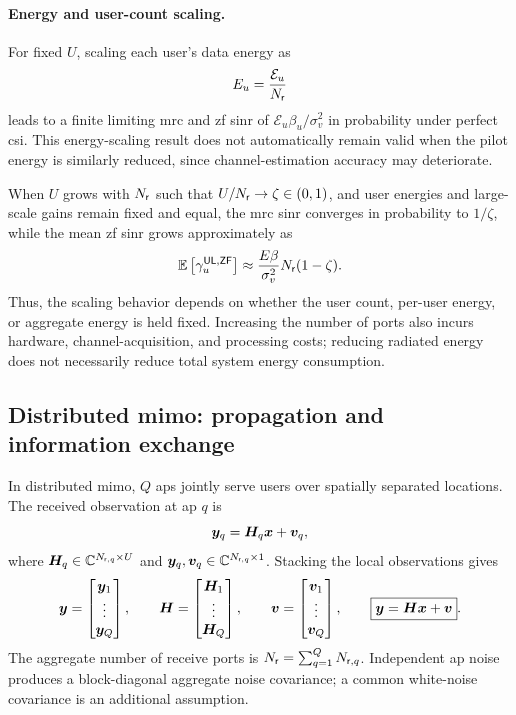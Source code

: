 \paragraph{Energy and user-count scaling.}
For fixed $U$, scaling each user's data energy as
\begin{equation*}
	E_u=\frac{\mathcal E_u}{N_{\mathsf{r}}}
\end{equation*}
leads to a finite limiting \ac{mrc} and \ac{zf} \ac{sinr} of $\mathcal E_u\beta_u/\sigma_v^2$ in probability under perfect \ac{csi}. This energy-scaling result does not automatically remain valid when the pilot energy is similarly reduced, since channel-estimation accuracy may deteriorate.

When $U$ grows with $N_{\mathsf{r}}$ such that $U/N_{\mathsf{r}}\to\zeta\in(0,1)$, and user energies and large-scale gains remain fixed and equal, the \ac{mrc} \ac{sinr} converges in probability to $1/\zeta$, while the mean \ac{zf} \ac{sinr} grows approximately as
\begin{equation*}
	\mathbb{E}\left[\gamma_u^{\mathsf{UL},\mathsf{ZF}}\right]
	\approx\frac{E\beta}{\sigma_v^2}N_{\mathsf{r}}(1-\zeta).
\end{equation*}
Thus, the scaling behavior depends on whether the user count, per-user energy, or aggregate energy is held fixed. Increasing the number of ports also incurs hardware, channel-acquisition, and processing costs; reducing radiated energy does not necessarily reduce total system energy consumption.

\subsection{Distributed \ac{mimo}: propagation and information exchange}
In distributed \ac{mimo}, $Q$ \acp{ap} jointly serve users over spatially separated locations. The received observation at \ac{ap} $q$ is
\begin{equation*}
	\bm{y}_q=\bm{H}_q\bm{x}+\bm{v}_q,
\end{equation*}
where $\bm{H}_q\in\mathbb{C}^{N_{\mathsf r,q}\times U}$ and $\bm{y}_q,\bm{v}_q\in\mathbb{C}^{N_{\mathsf r,q}\times1}$. Stacking the local observations gives
\begin{equation}
	\bm{y}=
	\begin{bmatrix}\bm{y}_1\\\vdots\\\bm{y}_Q\end{bmatrix},
	\qquad
	\bm{H}=
	\begin{bmatrix}\bm{H}_1\\\vdots\\\bm{H}_Q\end{bmatrix},
	\qquad
	\bm{v}=
	\begin{bmatrix}\bm{v}_1\\\vdots\\\bm{v}_Q\end{bmatrix},
	\qquad
	\boxed{\bm{y}=\bm{H}\bm{x}+\bm{v}}.
	\label{eq06:distributed}
\end{equation}
The aggregate number of receive ports is $N_{\mathsf{r}}=\sum_{q=1}^{Q}N_{\mathsf r,q}$. Independent \ac{ap} noise produces a block-diagonal aggregate noise covariance; a common white-noise covariance is an additional assumption.

